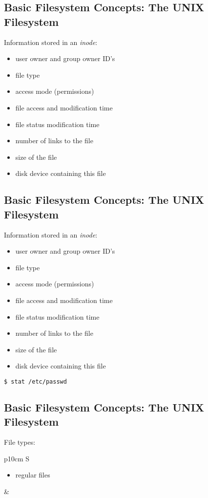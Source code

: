 \documentclass[xga]{xdvislides}
\begin{document}
\subsection{Basic Filesystem Concepts: The UNIX Filesystem}
Information stored in an {\em inode}:
\begin{itemize}
	\item user owner and group owner ID's
	\item file type
	\item access mode (permissions)
	\item file access and modification time
	\item file status modification time
	\item number of links to the file
	\item size of the file
	\item disk device containing this file
\end{itemize}

\subsection{Basic Filesystem Concepts: The UNIX Filesystem}
Information stored in an {\em inode}:
\begin{itemize}
	\item user owner and group owner ID's
	\item file type
	\item access mode (permissions)
	\item file access and modification time
	\item file status modification time
	\item number of links to the file
	\item size of the file
	\item disk device containing this file
\end{itemize}

\begin{verbatim}
$ stat /etc/passwd
\end{verbatim}

\subsection{Basic Filesystem Concepts: The UNIX Filesystem}
File types:
\\

\begin{tabular}{ p{10cm} S }
\begin{itemize}
	\item regular files
\end{itemize}
&  \\
\end{tabular}
\\
\end{document}
